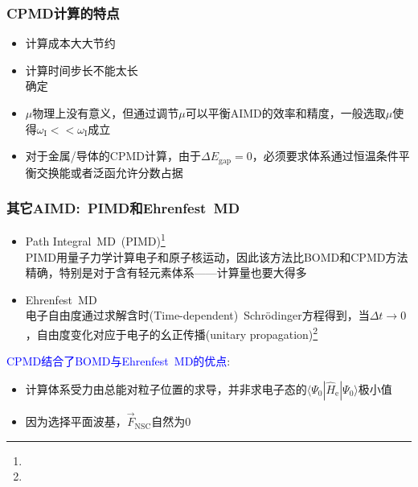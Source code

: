{\frame
{
	\frametitle{\textrm{CPMD}计算的特点}
	\begin{itemize}
		\item 计算成本大大节约\\
			{\fontsize{8.2pt}{4.2pt}}
		\item 计算时间步长不能太长\\
			{\fontsize{8.2pt}{4.2pt}}确定
		\item $\mu$物理上没有意义，但通过调节$\mu$可以平衡\textrm{AIMD}的效率和精度，一般选取$\mu$使得$\omega_{\mathrm{I}}<<\omega_{\mathrm{I}}$成立
		\item 对于金属/导体的\textrm{CPMD}计算，由于$\Delta E_{\mathrm{gap}}=0$，必须要求体系通过恒温条件平衡交换能或者泛函允许分数占据
		\end{itemize}
}

\frame
{
	\frametitle{其它\textrm{AIMD}:~\textrm{PIMD}和\textrm{Ehrenfest~MD}}
	\begin{itemize}
		\item \textrm{Path Integral~MD~(PIMD)}\footnote{\fontsize{6.2pt}{4.2pt}}\\
			\textrm{PIMD}用量子力学计算电子和原子核运动，因此该方法比\textrm{BOMD}和\textrm{CPMD}方法精确，特别是对于含有轻元素体系——计算量也要大得多
		\item \textrm{Ehrenfest~MD}\\
			电子自由度通过求解含时\textrm{(Time-dependent)~Schr\"odinger}方程得到，当$\Delta t\rightarrow0$，自由度变化对应于电子的幺正传播\textrm{(unitary propagation)}\footnote{\fontsize{6.2pt}{4.2pt}}
	\end{itemize}
	\textcolor{blue}{\textrm{CPMD}结合了\textrm{BOMD}与\textrm{Ehrenfest~MD}的优点}:
	\begin{itemize}
		\item 计算体系受力由总能对粒子位置的求导，并非求电子态的$\langle\Psi_0|\hat H_{\mathrm{e}}|\Psi_0\rangle$极小值
		\item 因为选择平面波基，$\vec F_{\mathrm{NSC}}$自然为0
	\end{itemize}
}

}
